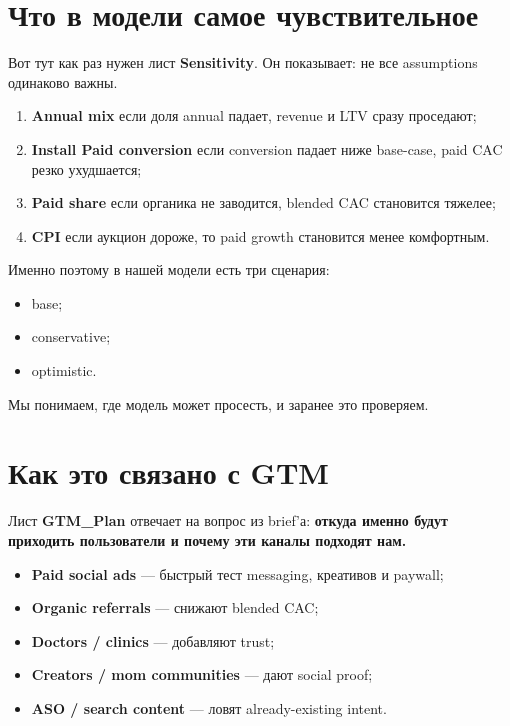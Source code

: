 \documentclass[10pt,a4paper]{article}
\begin{document}
\section{Что в модели самое чувствительное}

Вот тут как раз нужен лист \textbf{Sensitivity}. Он показывает: не все assumptions одинаково важны.

\begin{redbox}
\begin{enumerate}
    \item \textbf{Annual mix}  
    если доля annual падает, revenue и LTV сразу проседают;

    \item \textbf{Install \textrightarrow Paid conversion}  
    если conversion падает ниже base-case, paid CAC резко ухудшается;

    \item \textbf{Paid share}  
    если органика не заводится, blended CAC становится тяжелее;

    \item \textbf{CPI}  
    если аукцион дороже, то paid growth становится менее комфортным.
\end{enumerate}
\end{redbox}

Именно поэтому в нашей модели есть три сценария:
\begin{itemize}
    \item base;
    \item conservative;
    \item optimistic.
\end{itemize}

Мы понимаем, где модель может просесть, и заранее это проверяем.

\section{Как это связано с GTM}

Лист \textbf{GTM\_Plan} отвечает на вопрос из brief'а:  
\textbf{откуда именно будут приходить пользователи и почему эти каналы подходят нам.}

\begin{softbox}
\begin{itemize}
    \item \textbf{Paid social ads} --- быстрый тест messaging, креативов и paywall;
    \item \textbf{Organic referrals} --- снижают blended CAC;
    \item \textbf{Doctors / clinics} --- добавляют trust;
    \item \textbf{Creators / mom communities} --- дают social proof;
    \item \textbf{ASO / search content} --- ловят already-existing intent.
\end{itemize}
\end{softbox}
\end{document}
